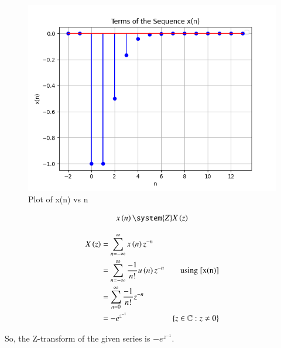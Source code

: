 \documentclass[journal,12pt,twocolumn]{IEEEtran}
\begin{document}
 \begin{figure}[h]
   \centering
   \includegraphics[width=1\columnwidth]{figs/plot.png}
   \caption{Plot of x(n) vs n}
   \label{fig: 9.1.12.1}
 \end{figure}

\begin{align}
	x \brak{n} \system{Z} X \brak{z} 
\end{align}

\begin{align}
    X \left(z\right) & = \sum_{n=-\infty}^{\infty} x \left(n\right)   z^{-n} \\
    & = \sum_{n=-\infty}^{\infty} \frac{-1}{n!}  u \left(n\right)   z^{-n} & \text{using } \eqref{x(n)}\\
    & = \sum_{n=0}^{\infty} \frac{-1}{n!}   z^{-n} \\
    & = - e^{z^{-1}} &  \left\{z\in\mathbb{C} : z \neq 0\right\} 
\end{align}

So, the Z-transform of the given series is
$ - e^{z^{-1}} $.\\






\end{document}
